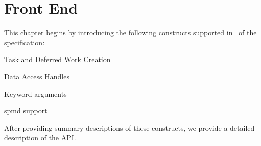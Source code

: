 
\chapter{Front End}
\label{chap:front_end}

This chapter begins by introducing the following constructs supported in
\specVersion\ of the specification:
\begin{compactitem}
\item Task and Deferred Work Creation
\item Data Access Handles
\item Keyword arguments
\item \gls{spmd} support
\end{compactitem}
After providing summary descriptions of these constructs, we provide a detailed description of the
\gls{API}.





%













